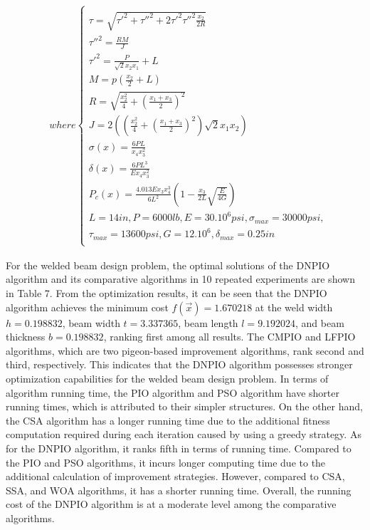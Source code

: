 \documentclass[preprint,review,compress,12pt]{elsarticle}
\begin{document}
\begin{equation}  \begin{split} &where\left\{\begin{matrix}\\ \tau = \sqrt{\tau'^2+\tau''^2+2\tau'^2\tau''^2\frac{x_2}{2R} }  \\ \tau''^2 = \frac{RM}{J}\\ \tau'^2 =\frac{P}{\sqrt{2}x_2x_1 }+L \\ M=p (\frac{x_2}{2}+L )\\ R=\sqrt{\frac{x^2_2}{4}+ (\frac{x_1+x_3}{2})^2} \\ J=2((\frac{x^2_2}{4}+ (\frac{x_1+x_3}{2})^2)\sqrt{2}x_1x_2 )\\\sigma (x)=\frac{6PL}{x_4x^2_3}\\\delta (x)=\frac{6PL^3}{Ex_4x^2_3}\\P_c(x)=\frac{4.013Ex_3x^3_4}{6L^2}(1-\frac{x_3}{2L}\sqrt{\frac{E}{4G}}   )\\L=14in,P=6000lb,E =30.10^6psi,\sigma _{max}=30000psi,\\ 
\tau _{max} =13600psi,G=12.10^6,\delta _{max}=0.25in\\\end{matrix}\right.\end{split}  \end{equation}

For the welded beam design problem, the optimal solutions of the DNPIO algorithm and its comparative algorithms in 10 repeated experiments are shown in Table 7. From the optimization results, it can be seen that the DNPIO algorithm achieves the minimum cost $f(\vec{x})=1.670218$ at the weld width $h=0.198832$, beam width $t=3.337365$, beam length $l=9.192024$, and beam thickness $b=0.198832$, ranking first among all results. The CMPIO and LFPIO algorithms, which are two pigeon-based improvement algorithms, rank second and third, respectively. This indicates that the DNPIO algorithm possesses stronger optimization capabilities for the welded beam design problem. In terms of algorithm running time, the PIO algorithm and PSO algorithm have shorter running times, which is attributed to their simpler structures. On the other hand, the CSA algorithm has a longer running time due to the additional fitness computation required during each iteration caused by using a greedy strategy. As for the DNPIO algorithm, it ranks fifth in terms of running time. Compared to the PIO and PSO algorithms, it incurs longer computing time due to the additional calculation of improvement strategies. However, compared to CSA, SSA, and WOA algorithms, it has a shorter running time. Overall, the running cost of the DNPIO algorithm is at a moderate level among the comparative algorithms.
\end{document}
